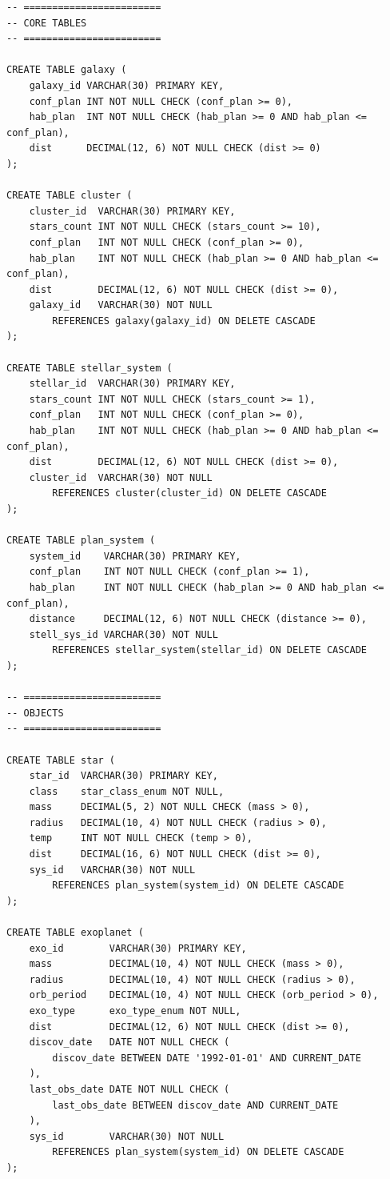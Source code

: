 \documentclass[14pt,a4paper]{extarticle}
\begin{document}
\begin{lstlisting}
-- ========================
-- CORE TABLES
-- ========================

CREATE TABLE galaxy (
    galaxy_id VARCHAR(30) PRIMARY KEY,
    conf_plan INT NOT NULL CHECK (conf_plan >= 0),
    hab_plan  INT NOT NULL CHECK (hab_plan >= 0 AND hab_plan <= conf_plan),
    dist      DECIMAL(12, 6) NOT NULL CHECK (dist >= 0)
);

CREATE TABLE cluster (
    cluster_id  VARCHAR(30) PRIMARY KEY,
    stars_count INT NOT NULL CHECK (stars_count >= 10),
    conf_plan   INT NOT NULL CHECK (conf_plan >= 0),
    hab_plan    INT NOT NULL CHECK (hab_plan >= 0 AND hab_plan <= conf_plan),
    dist        DECIMAL(12, 6) NOT NULL CHECK (dist >= 0),
    galaxy_id   VARCHAR(30) NOT NULL
        REFERENCES galaxy(galaxy_id) ON DELETE CASCADE
);

CREATE TABLE stellar_system (
    stellar_id  VARCHAR(30) PRIMARY KEY,
    stars_count INT NOT NULL CHECK (stars_count >= 1),
    conf_plan   INT NOT NULL CHECK (conf_plan >= 0),
    hab_plan    INT NOT NULL CHECK (hab_plan >= 0 AND hab_plan <= conf_plan),
    dist        DECIMAL(12, 6) NOT NULL CHECK (dist >= 0),
    cluster_id  VARCHAR(30) NOT NULL
        REFERENCES cluster(cluster_id) ON DELETE CASCADE
);

CREATE TABLE plan_system (
    system_id    VARCHAR(30) PRIMARY KEY,
    conf_plan    INT NOT NULL CHECK (conf_plan >= 1),
    hab_plan     INT NOT NULL CHECK (hab_plan >= 0 AND hab_plan <= conf_plan),
    distance     DECIMAL(12, 6) NOT NULL CHECK (distance >= 0),
    stell_sys_id VARCHAR(30) NOT NULL
        REFERENCES stellar_system(stellar_id) ON DELETE CASCADE
);

-- ========================
-- OBJECTS
-- ========================

CREATE TABLE star (
    star_id  VARCHAR(30) PRIMARY KEY,
    class    star_class_enum NOT NULL,
    mass     DECIMAL(5, 2) NOT NULL CHECK (mass > 0),
    radius   DECIMAL(10, 4) NOT NULL CHECK (radius > 0),
    temp     INT NOT NULL CHECK (temp > 0),
    dist     DECIMAL(16, 6) NOT NULL CHECK (dist >= 0),
    sys_id   VARCHAR(30) NOT NULL
        REFERENCES plan_system(system_id) ON DELETE CASCADE
);

CREATE TABLE exoplanet (
    exo_id        VARCHAR(30) PRIMARY KEY,
    mass          DECIMAL(10, 4) NOT NULL CHECK (mass > 0),
    radius        DECIMAL(10, 4) NOT NULL CHECK (radius > 0),
    orb_period    DECIMAL(10, 4) NOT NULL CHECK (orb_period > 0),
    exo_type      exo_type_enum NOT NULL,
    dist          DECIMAL(12, 6) NOT NULL CHECK (dist >= 0),
    discov_date   DATE NOT NULL CHECK (
        discov_date BETWEEN DATE '1992-01-01' AND CURRENT_DATE
    ),
    last_obs_date DATE NOT NULL CHECK (
        last_obs_date BETWEEN discov_date AND CURRENT_DATE
    ),
    sys_id        VARCHAR(30) NOT NULL
        REFERENCES plan_system(system_id) ON DELETE CASCADE
);


\end{lstlisting}
\end{document}
